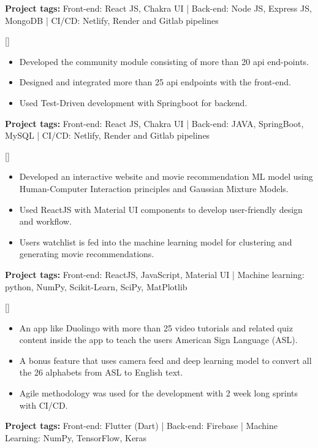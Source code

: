 \documentclass{article}
\begin{document}
\textbf{Project tags:} Front-end: React JS, Chakra UI | Back-end: Node JS, Express JS, MongoDB | CI/CD: Netlify, Render and Gitlab pipelines

[] 
\item
\begin{itemize}
\item Developed the community module consisting of more than 20 api end-points.
\item Designed and integrated more than 25 api endpoints with the front-end.
\item Used Test-Driven development with Springboot for backend.

\end{itemize}

\textbf{Project tags:} Front-end: React JS, Chakra UI | Back-end: JAVA, SpringBoot, MySQL | CI/CD: Netlify, Render and Gitlab pipelines

[]
\begin{itemize}
\item Developed an interactive website and movie recommendation ML model using Human-Computer Interaction principles and Gaussian Mixture Models. 
\item Used ReactJS with Material UI components to develop user-friendly design and workflow.
\item Users watchlist is fed into the machine learning model for clustering and generating movie recommendations.
\end{itemize}
\textbf{Project tags:} 
Front-end: ReactJS, JavaScript, Material UI | Machine learning: python, NumPy, Scikit-Learn, SciPy, MatPlotlib 

[]
\begin{itemize}
\item An app like Duolingo with more than 25 video tutorials and related quiz content inside the app to teach the users American Sign Language (ASL).
\item A bonus feature that uses camera feed and deep learning model to convert all the 26 alphabets from ASL to English text.
\item Agile methodology was used for the development with 2 week long sprints with CI/CD.
\end{itemize}
\textbf{Project tags:} 
Front-end: Flutter (Dart) | Back-end: Firebase | Machine Learning: NumPy, TensorFlow, Keras


\end{document}
